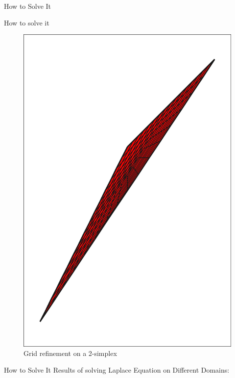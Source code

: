 \documentclass{beamer}
\begin{document}
\begin{section}{How to Solve It}
\begin{frame}{How to solve it}
\begin{figure}
        \includegraphics[scale=0.06]{grid-1.jpg}
        \caption{Grid refinement on a 2-simplex}
    \end{figure}
\end{frame}
\begin{frame}{How to Solve It}
    Results of solving Laplace Equation on Different Domains:
    \begin{figure}

\end{figure}
\end{frame}
\end{section}
\end{document}
